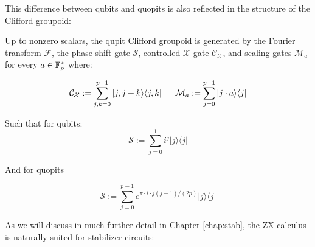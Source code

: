 This difference between qubits and quopits  is also reflected in the structure of the Clifford groupoid:

\begin{lemma}
Up to nonzero scalars, the qupit Clifford groupoid is generated by the Fourier transform $\mathcal F$, the  phase-shift gate $\mathcal S$, controlled-$\mathcal X$ gate $\mathcal{C}_{\mathcal X}$, and scaling gates $\mathcal{M}_a$ for every $a \in \mathbb{F}_p^*$ where:


$$
\mathcal{C}_{\mathcal X}:= \sum_{j,k=0}^{p-1} |j,j+k \rangle \langle j,k |\, \hspace*{.5cm}
\mathcal{M}_a := \sum_{j=0}^{p-1} |j\cdot a \rangle\langle j |
$$ 

Such that for qubits:
$$
\mathcal{S}:= \sum_{j=0}^{1} i^j |j\rangle\langle j |
$$


And for quopits

$$
\mathcal{S}:= \sum_{j=0}^{p-1} e^{\pi\cdot i \cdot j(j-1)/(2p)} |j\rangle\langle j |
$$
\end{lemma}


As we will discuss in much further detail in Chapter \ref{chap:stab}, the ZX-calculus is naturally suited for stabilizer circuits:

